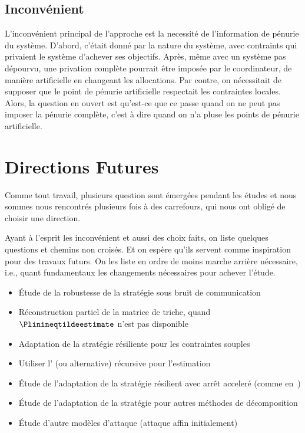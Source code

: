 \documentclass[../main.tex]{subfiles}
\begin{document}
\subsection{Inconvénient}
L'inconvénient principal de l'approche est la necessité de l'information de pénurie du système.
D'abord, c'était donné par la nature du système, avec contraints qui privaient le système d'achever ses objectifs.
Après, même avec un système pas dépourvu, une privation complète pourrait être imposée par le coordinateur, de manière artificielle en changeant les allocations.
Par contre, on nécessitait de supposer que le point de pénurie artificielle respectait les contraintes locales.
Alors, la question en ouvert est qu'est-ce que ce passe quand on ne peut pas imposer la pénurie complète, c'est à dire quand on n'a pluse les points de pénurie artificielle.

\section{Directions Futures}
Comme tout travail, plusieurs question sont émergées pendant les études et nous sommes nous rencontrés plusieurs fois à des carrefours, qui nous ont obligé de choisir une direction.

Ayant à l'esprit les inconvénient et aussi des choix faits, on liste quelques questions et chemins non croisés.
Et on espère qu'ils servent comme inspiration pour des travaux futurs.
On les liste en ordre de moins marche arrière nécessaire, i.e., quant fundamentaux les changements nécessaires pour achever l'étude.
\begin{itemize}
  \item Étude de la robustesse de la stratégie sous bruit de communication
  \item Réconstruction partiel de la matrice de triche, quand $\Plinineqtildeestimate$ n'est pas disponible
  \item Adaptation de la stratégie résiliente pour les contraintes souples~\cite{AlessioBemporad2009}
  \item Utiliser l'\EM{} (ou alternative) récursive pour l'estimation
  \item Étude de l'adaptation de la stratégie résilient avec arrêt acceleré (comme en~\cite{DaiEtAl2017})
  \item Étude de l'adaptation de la stratégie pour autres méthodes de décomposition
  \item Étude d'autre modèles d'attaque (attaque affin initialement)
\end{itemize}
\end{document}
